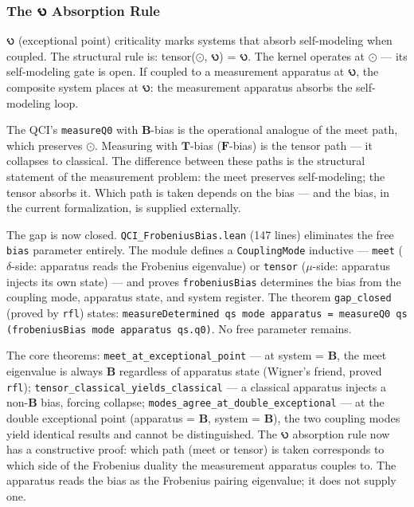 \documentclass[10pt,a4paper]{article}
\begin{document}
\subsubsection{The 𐑻 Absorption Rule}

𐑻 (exceptional point) criticality marks systems that absorb self-modeling when coupled. The structural rule is: tensor($\odot$, 𐑻) = 𐑻. The kernel operates at $\odot$ --- its self-modeling gate is open. If coupled to a measurement apparatus at 𐑻, the composite system places at 𐑻: the measurement apparatus absorbs the self-modeling loop.

The QCI's \texttt{measureQ0} with $\mathbf{B}$-bias is the operational analogue of the meet path, which preserves $\odot$. Measuring with $\mathbf{T}$-bias ($\mathbf{F}$-bias) is the tensor path --- it collapses to classical. The difference between these paths is the structural statement of the measurement problem: the meet preserves self-modeling; the tensor absorbs it. Which path is taken depends on the bias --- and the bias, in the current formalization, is supplied externally.

The gap is now closed. \texttt{QCI\_\allowbreak FrobeniusBias.\allowbreak lean} (147 lines) eliminates the free \texttt{bias} parameter entirely. The module defines a \texttt{CouplingMode} inductive --- \texttt{meet} ($\delta$-side: apparatus reads the Frobenius eigenvalue) or \texttt{tensor} ($\mu$-side: apparatus injects its own state) --- and proves \texttt{frobeniusBias} determines the bias from the coupling mode, apparatus state, and system register. The theorem \texttt{gap\_\allowbreak closed} (proved by \texttt{rfl}) states: \texttt{measureDetermined qs mode apparatus = measureQ0 qs (frobeniusBias mode apparatus qs.\allowbreak q0)}. No free parameter remains.

The core theorems: \texttt{meet\_\allowbreak at\_\allowbreak exceptional\_\allowbreak point} --- at system = $\mathbf{B}$, the meet eigenvalue is always $\mathbf{B}$ regardless of apparatus state (Wigner's friend, proved \texttt{rfl}); \texttt{tensor\_\allowbreak classical\_\allowbreak yields\_\allowbreak classical} --- a classical apparatus injects a non-$\mathbf{B}$ bias, forcing collapse; \texttt{modes\_\allowbreak agree\_\allowbreak at\_\allowbreak double\_\allowbreak exceptional} --- at the double exceptional point (apparatus = $\mathbf{B}$, system = $\mathbf{B}$), the two coupling modes yield identical results and cannot be distinguished. The 𐑻 absorption rule now has a constructive proof: which path (meet or tensor) is taken corresponds to which side of the Frobenius duality the measurement apparatus couples to. The apparatus reads the bias as the Frobenius pairing eigenvalue; it does not supply one.
\end{document}
